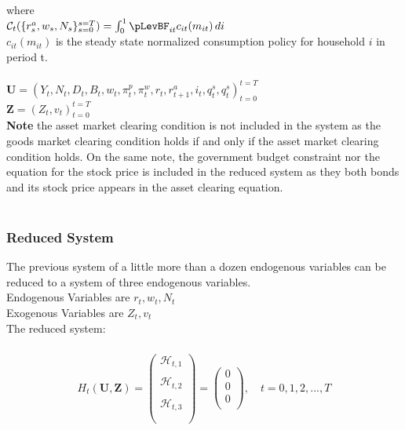 \documentclass[titlepage]{\econtex}\providecommand{\texname}{BufferStockTheory}
\begin{document}
 
 where \\
 
$\mathcal{C}_{t}(\{r_{s}^{a} ,w_{s}, N_{s}\}_{s=0}^{s=T}) = \int_{0}^{1} \pLevBF_{it} c_{it}(m_{it})\, di $ \\
 
$c_{it}(m_{it})$ is the steady state normalized consumption policy for household $i$ in period t. \\ \\
 

 
 
 $\mathbf{U} = \left(Y_{t} , N_{t} ,  D_{t
 }, B_{t}, w_{t} , \pi_{t}^{p} ,\pi_{t}^{w}, r_{t} , r_{t+1}^{a}, i_{t} , q_{t}^{s},  q_{t}^{s} \right)_{t=0}^{t=T}$ \\ 

 
 $\mathbf{Z} = \left(Z_{t} ,v_{t}\right)_{t=0}^{t=T}$ \\
 
 \textbf{Note} the asset market clearing condition is not included in the system as the goods market clearing condition holds if and only if the asset market clearing condition holds. On the same note, the government budget constraint nor the equation for the stock price is included in the reduced system as they both bonds and its stock price appears in the asset clearing equation.  \\ \\
 
 
 
\hypertarget{Reduced System}{}
\subsubsection{Reduced System}
 
The previous system of a little more than a dozen endogenous variables can be reduced to a system of three endogenous variables. \\ 
 
Endogenous Variables are $ r_{t} , w_{t} ,N_{t}$ \\ 
 
Exogenous Variables are $ Z_{t}, v_{t}$ \\ 

The reduced system: \\ \\

\begin{eqnarray} 
H_{t}(\mathbf{U},\mathbf{Z})= \begin{pmatrix} 
\mathcal{H}_{t,1} \\ \\ 
\mathcal{H}_{t,2} \\ \\
\mathcal{H}_{t,3} \\ \\
 \end{pmatrix} = \begin{pmatrix} 0 \\ 0 \\ 0 \\ \end{pmatrix} , \quad  t = 0, 1, 2, ..., T 
 \end{eqnarray}
 
\end{document}
